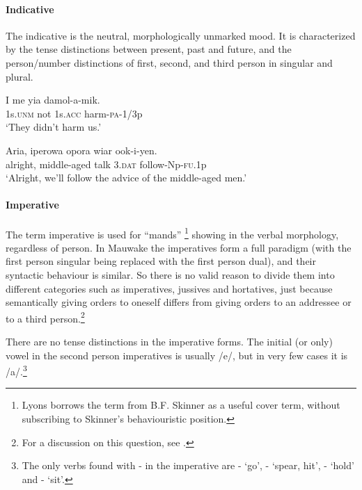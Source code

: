\paragraph[Indicative]{Indicative}
{}
The indicative is the neutral, morphologically unmarked mood. It is characterized by the tense distinctions between present, past and future, and the person/number distinctions of first, second, and third person in singular and plural. 

\ea%
\label{ex:x693}
\gll I me yia damol-a-mik. \\
1s.\textsc{unm} not 1s.\textsc{acc} harm-\textsc{pa}-1/3p\\
\glt`They didn't harm us.'
\z

\ea%
\label{ex:x694}
\gll Aria, iperowa opora wiar ook-i-yen. \\
alright, middle-aged talk 3.\textsc{dat} follow-Np-\textsc{fu}.1p\\
\glt`Alright, we'll follow the advice of the middle-aged men.'
\z

\paragraph[Imperative]{Imperative}
{}
The term imperative is used for ``mands'' \citep[745]{Lyons1977}\footnote{Lyons borrows the term from B.F. Skinner as a useful cover term, without subscribing to Skinner's behaviouristic position.} showing in the verbal morphology, regardless of person. In Mauwake the imperatives form a full paradigm (with the first person singular being replaced with the first person dual), and their syntactic behaviour is similar. So there is no valid reason to divide them into different categories such as imperatives, jussives and hortatives, just because semantically giving orders to oneself differs from giving orders to an addressee or to a third person.\footnote{For a discussion on this question, see \citet[109--111]{Palmer1986}.}

There are no tense distinctions in the imperative forms. The initial (or only) vowel in the second person imperatives is usually /e/, but in very few cases it is /a/.\footnote{The only verbs found with - in the imperative are - `go', - `spear, hit', - `hold' and - `sit'.}

